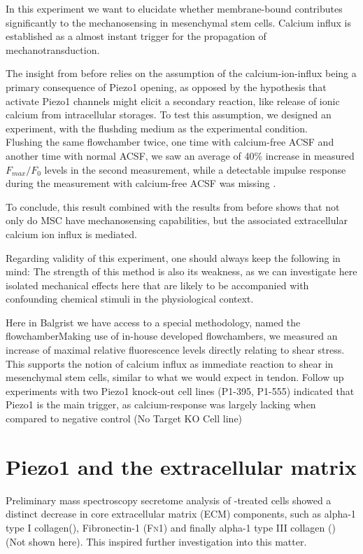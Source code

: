 In this experiment we want to elucidate whether membrane-bound \Piezo{} contributes significantly to the mechanosensing in mesenchymal stem cells. Calcium influx is established as a almost instant trigger for the propagation of mechanotransduction.

The insight from before relies on the assumption of the calcium-ion-influx being a primary consequence of Piezo1 opening, as opposed by the hypothesis that activate Piezo1 channels might elicit a secondary reaction, like release of ionic calcium from intracellular storages. To test this assumption, we designed an experiment, with the flushding medium as the experimental condition.\\
Flushing the same flowchamber twice, one time with calcium-free ACSF and another time with normal ACSF, we saw an average of 40\% increase in measured $F_{max}/F_{0}$ levels in the second measurement, while a detectable impulse response during the measurement with calcium-free ACSF was missing .\par

To conclude, this result combined with the results from before shows that not only do MSC have mechanosensing capabilities, but the associated extracellular calcium ion influx is \Piezo{} mediated. 

Regarding validity of this experiment, one should always keep the following in mind: The strength of this method is also its weakness, as we can investigate here isolated mechanical effects here that are likely to be accompanied with confounding chemical stimuli in the physiological context.


Here in Balgrist we have access to a special methodology, named the flowchamberMaking use of in-house developed flowchambers, we measured an increase of maximal relative fluorescence levels directly relating to shear stress. This supports the notion of calcium influx as immediate reaction to shear in mesenchymal stem cells, similar to what we would expect in tendon. Follow up experiments with two Piezo1 knock-out cell lines (P1-395, P1-555) indicated that Piezo1 is the main trigger, as calcium-response was largely lacking when compared to negative control (No Target KO Cell line)

\section{Piezo1 and the extracellular matrix}

Preliminary mass spectroscopy secretome analysis of \Yoda-treated cells showed a distinct decrease in core extracellular matrix (ECM) components, such as alpha-1 type I collagen(\colone), Fibronectin-1 (\textsc{Fn1}) and finally alpha-1 type III collagen (\colthree) (Not shown here).
This inspired further investigation into this matter.\par

